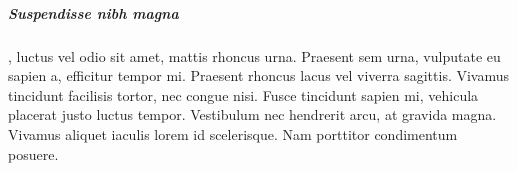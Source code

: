 \documentclass[a4paper,12pt,draft]{report}
\begin{document}
\subparagraph{Suspendisse nibh magna}, luctus vel odio sit amet, mattis rhoncus urna. Praesent sem urna, vulputate eu sapien a, efficitur tempor mi. Praesent rhoncus lacus vel viverra sagittis. Vivamus tincidunt facilisis tortor, nec congue nisi. Fusce tincidunt sapien mi, vehicula placerat justo luctus tempor. Vestibulum nec hendrerit arcu, at gravida magna. Vivamus aliquet iaculis lorem id scelerisque. Nam porttitor condimentum posuere.










\listoffigures
{}
\listoftables
{}
\end{document}
